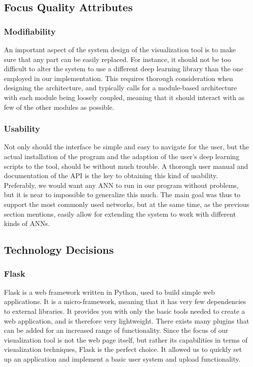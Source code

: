 \subsection{Focus Quality Attributes}

\subsubsection{Modifiability}

An important aspect of the system design of the visualization tool is to make sure that any part can be easily replaced. For instance, it should not be too difficult to alter the system to use a different deep learning library than the one employed in our implementation. This requires thorough consideration when designing the architecture, and typically calls for a module-based architecture with each module being loosely coupled, meaning that it should interact with as few of the other modules as possible.

\subsubsection{Usability}

Not only should the interface be simple and easy to navigate for the user, but the actual installation of the program and the adaption of the user's deep learning scripts to the tool, should be without much trouble. A thorough user manual and documentation of the API is the key to obtaining this kind of usability. Preferably, we would want any ANN to run in our program without problems, but it is near to impossible to generalize this much. The main goal was thus to support the most commonly used networks, but at the same time, as the previous section mentions, easily allow for extending the system to work with different kinds of ANNs.

\subsection{Technology Decisions}

\subsubsection{Flask}

Flask is a web framework written in Python, used to build simple web applications. It is a micro-framework, meaning that it has very few dependencies to external libraries. It provides you with only the basic tools needed to create a web application, and is therefore very lightweight. There exists many plugins that can be added for an increased range of functionality. Since the focus of our visualization tool is not the web page itself, but rather its capabilities in terms of visualization techniques, Flask is the perfect choice. It allowed us to quickly set up an application and implement a basic user system and upload functionality.

